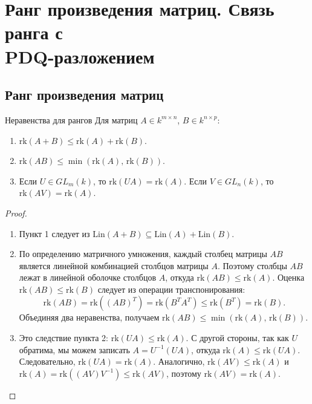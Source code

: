 
\section{Ранг произведения матриц. Связь ранга с \\ PDQ-разложением}

\subsection{Ранг произведения матриц}

\begin{Theorem}{Неравенства для рангов}{}
	Для матриц $A \in k^{m \times n}$, $B \in k^{n \times p}$:
	\begin{enumerate}
		\item $\mathrm{rk}(A + B) \leq \mathrm{rk}(A) + \mathrm{rk}(B)$.
		\item $\mathrm{rk}(AB) \leq \min(\mathrm{rk}(A),\, \mathrm{rk}(B))$.
		\item Если $U \in GL_m(k)$, то $\mathrm{rk}(UA) = \mathrm{rk}(A)$. Если $V \in GL_n(k)$, то $\mathrm{rk}(AV) = \mathrm{rk}(A)$.
	\end{enumerate}
\end{Theorem}

\begin{proof}
	\begin{enumerate}
		\item Пункт 1 следует из $\mathrm{Lin}(A+B) \subseteq \mathrm{Lin}(A) + \mathrm{Lin}(B)$.
		\item По определению матричного умножения, каждый столбец матрицы $AB$ является линейной комбинацией столбцов матрицы $A$. Поэтому столбцы $AB$ лежат в линейной оболочке столбцов $A$, откуда $\mathrm{rk}(AB) \leq \mathrm{rk}(A)$.
		Оценка $\mathrm{rk}(AB) \leq \mathrm{rk}(B)$ следует из операции транспонирования: 
		\[
		\mathrm{rk}(AB) = \mathrm{rk}((AB)^T) = \mathrm{rk}(B^T A^T) \leq \mathrm{rk}(B^T) = \mathrm{rk}(B).
		\]
		Объединяя два неравенства, получаем $\mathrm{rk}(AB) \leq \min(\mathrm{rk}(A),\, \mathrm{rk}(B))$.
		
		\item Это следствие пункта 2: $\mathrm{rk}(UA) \leq \mathrm{rk}(A)$. С другой стороны, так как $U$ обратима, мы можем записать $A = U^{-1}(UA)$, откуда $\mathrm{rk}(A) \leq \mathrm{rk}(UA)$. Следовательно, $\mathrm{rk}(UA) = \mathrm{rk}(A)$.
		Аналогично, $\mathrm{rk}(AV) \leq \mathrm{rk}(A)$ и $\mathrm{rk}(A) = \mathrm{rk}((AV)V^{-1}) \leq \mathrm{rk}(AV)$, поэтому $\mathrm{rk}(AV) = \mathrm{rk}(A)$.
	\end{enumerate}
\end{proof}

